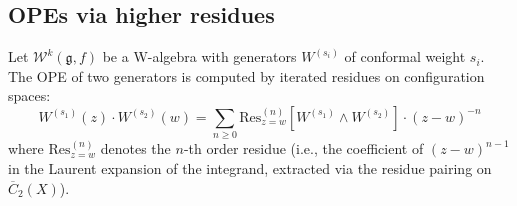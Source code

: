 \subsection{OPEs via higher residues}

\begin{theorem}\label{thm:w-geometric-ope}
Let $\mathcal{W}^k(\mathfrak{g},f)$ be a W-algebra with generators $W^{(s_i)}$ of conformal weight $s_i$.  The OPE of two generators is computed by iterated residues on configuration spaces:
\begin{equation}
W^{(s_1)}(z) \cdot W^{(s_2)}(w) = \sum_{n \geq 0} \mathrm{Res}^{(n)}_{z=w}\!\left[W^{(s_1)} \wedge W^{(s_2)}\right] \cdot (z-w)^{-n}
\end{equation}
where $\mathrm{Res}^{(n)}_{z=w}$ denotes the $n$-th order residue (i.e., the coefficient of $(z-w)^{n-1}$ in the Laurent expansion of the integrand, extracted via the residue pairing on $\overline{C}_2(X)$).
\end{theorem}

